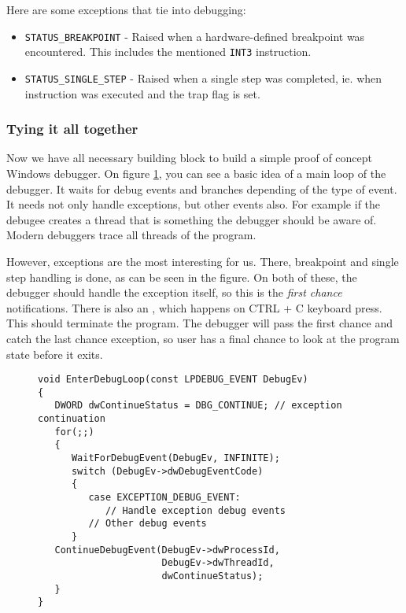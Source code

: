 Here are some exceptions that tie into debugging:
\begin{itemize}
    \item \texttt{STATUS_BREAKPOINT} - Raised when a hardware-defined breakpoint was encountered. This includes the mentioned \texttt{INT3} instruction.
    \item \texttt{STATUS_SINGLE_STEP} - Raised when a single step was completed, ie. when instruction was executed and the trap flag is set.
\end{itemize}

\subsubsection*{Tying it all together}
Now we have all necessary building block to build a simple proof of concept Windows debugger. On figure \ref{fig:windows-debugger-mainloop}, you can see a basic idea of a main loop of the debugger. It waits for debug events and branches depending of the type of event. It needs not only handle exceptions, but other events also. For example if the debugee creates a thread that is something the debugger should be aware of. Modern debuggers trace all threads of the program.

However, exceptions are the most interesting for us. There, breakpoint and single step handling is done, as can be seen in the figure. On both of these, the debugger should handle the exception itself, so this is the \textit{first chance} notifications. There is also an , which happens on CTRL + C keyboard press. This should terminate the program. The debugger will pass the first chance and catch the last chance exception, so user has a final chance to look at the program state before it exits.

\begin{figure}
    \label{fig:windows-debugger-mainloop}
    \begin{verbatim}
void EnterDebugLoop(const LPDEBUG_EVENT DebugEv)
{
   DWORD dwContinueStatus = DBG_CONTINUE; // exception continuation 
   for(;;) 
   { 
      WaitForDebugEvent(DebugEv, INFINITE); 
      switch (DebugEv->dwDebugEventCode) 
      { 
         case EXCEPTION_DEBUG_EVENT: 
            // Handle exception debug events
         // Other debug events
      } 
   ContinueDebugEvent(DebugEv->dwProcessId, 
                      DebugEv->dwThreadId, 
                      dwContinueStatus);
   }
}
    \end{verbatim}
\end{figure}


